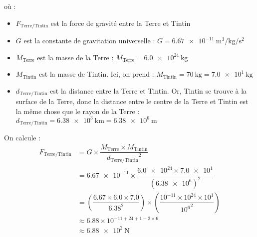 \documentclass[../Cours.tex]{subfiles}
\begin{document}
où : 
\begin{itemize}
    \item $F_{\mbox{Terre/Tintin}}$ est la force de gravité entre la Terre et Tintin
    \item $G$ est la constante de gravitation universelle : $G = \qty{6.67e-11}{\metre\cubed\per\kilo\gram\per\second\squared}$
    \item $M_{\mbox{Terre}}$ est la masse de la Terre : $M_{\mbox{Terre}} = \qty{6.0e24}{\kilo\gram}$
    \item $M_{\mbox{Tintin}}$ est la masse de Tintin. Ici, on prend : $M_{\mbox{Tintin}} = \qty{70}{\kilo\gram} = \qty{7.0e1}{\kilo\gram}$
    \item $d_{\mbox{Terre/Tintin}}$ est la distance entre la Terre et Tintin. Or, Tintin se trouve à la surface de la Terre, donc la distance entre le centre de la Terre et Tintin est la même chose que le rayon de la Terre : $d_{\mbox{Terre/Tintin}} = \qty{6.38e3}{\kilo\metre} = \qty{6.38e6}{\metre}$ 
\end{itemize}

\begin{center}
\end{center}

On calcule : 
\begin{align*}
    F_{\mbox{Terre/Tintin}} &= G \times \dfrac{M_{\mbox{Terre}} \times M_{\mbox{Tintin}}}{{d_{\mbox{Terre/Tintin}}}^2} \\
    &= \num{6.67e-11} \times \dfrac{\num{6.0e24} \times \num{7.0e1}}{\left(\num{6.38e6}\right)^2} \\
    &= \left( \dfrac{\num{6.67} \times \num{6.0} \times \num{7.0}}{\num{6.38}^2} \right) \times \left( \dfrac{10^{-11} \times 10^{24} \times 10^1}{{10^6}^2} \right) \\
    &\approx \num{6.88} \times 10^{-11+24+1-2\times 6} \\
    &\approx \qty{6.88e2}{\newton}
\end{align*}
\end{document}

